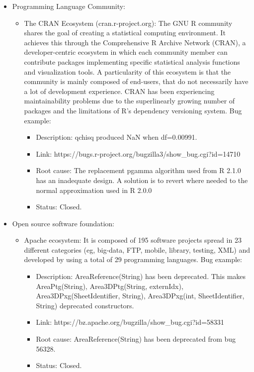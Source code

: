 \begin{itemize}
\item Programming Language Community: 
\begin{itemize}
  \item The CRAN Ecosystem (cran.r-project.org): The GNU R community shares the
  goal of creating a statistical computing environment. It achieves this through
  the Comprehensive R Archive Network (CRAN), a developer-centric ecosystem in which each community member can contribute packages implementing specific statistical analysis functions and visualization tools. A particularity of this ecosystem is that the community is mainly composed of end-users, that do not necessarily have a lot of development experience. CRAN has been experiencing maintainability problems due to the superlinearly growing number of packages and the limitations of R’s dependency versioning system. Bug example:
  \begin{itemize}
    \item Description: qchisq produced NaN when df=0.00991. 
    \item Link: https://bugs.r-project.org/bugzilla3/show\_bug.cgi?id=14710
    \item Root cause: The replacement
    pgamma algorithm used from R 2.1.0 has an inadequate design. A solution is
    to revert where needed to the normal approximation used in R 2.0.0 
    \item Status: Closed.
  \end{itemize}
\end{itemize}                                        	
\item Open source software foundation: 
\begin{itemize}
  \item Apache ecosystem: It is composed of 195 software projects
spread in 23 different categories (eg, big-data, FTP, mobile, library, testing, XML) and
developed by using a total of 29 programming languages. Bug example:
   \begin{itemize}
     \item Description: AreaReference(String) has been deprecated. This makes
     AreaPtg(String), Area3DPtg(String, externIdx), Area3DPxg(SheetIdentifier,
     String), Area3DPxg(int, SheetIdentifier, String) deprecated constructors.
    \item Link: https://bz.apache.org/bugzilla/show\_bug.cgi?id=58331
    \item Root cause: AreaReference(String) has been deprecated from bug 56328.
    \item Status: Closed.

\end{itemize}
\end{itemize}
\end{itemize}
